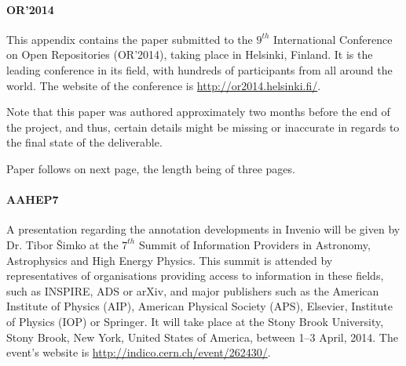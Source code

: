 
\paragraph{OR'2014} This appendix contains the paper submitted to the $9^{th}$
International Conference on Open Repositories (OR'2014), taking place in
Helsinki, Finland. It is the leading conference in its field, with hundreds of
participants from all around the world. The website of the conference is
\url{http://or2014.helsinki.fi/}.

Note that this paper was authored approximately two months before the end of
the project, and thus, certain details might be missing or inaccurate in
regards to the final state of the deliverable.

Paper follows on next page, the length being of three pages.

\paragraph{AAHEP7} A presentation regarding the annotation developments in
Invenio will be given by Dr. Tibor \v{S}imko at the $7^{th}$ Summit of
Information Providers in Astronomy, Astrophysics and High Energy Physics. This
summit is attended by representatives of organisations providing access to
information in these fields, such as INSPIRE, ADS or arXiv, and major
publishers such as the American Institute of Physics (AIP), American Physical
Society (APS), Elsevier, Institute of Physics (IOP) or Springer. It will take
place at the Stony Brook University, Stony Brook, New York, United States of
America, between 1--3 April, 2014. The event's website is
\url{http://indico.cern.ch/event/262430/}.


